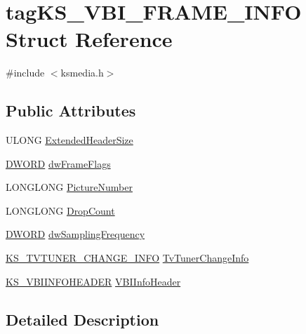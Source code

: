 \hypertarget{structtag_k_s___v_b_i___f_r_a_m_e___i_n_f_o}{}\section{tag\+K\+S\+\_\+\+V\+B\+I\+\_\+\+F\+R\+A\+M\+E\+\_\+\+I\+N\+FO Struct Reference}
\label{structtag_k_s___v_b_i___f_r_a_m_e___i_n_f_o}


{\ttfamily \#include $<$ksmedia.\+h$>$}

\subsection*{Public Attributes}
\begin{DoxyCompactItemize}
\item 
U\+L\+O\+NG \hyperlink{structtag_k_s___v_b_i___f_r_a_m_e___i_n_f_o_a42566ef5e7c61900b52aeed3ca15149b}{Extended\+Header\+Size}
\item 
\hyperlink{mapinls_8h_ad342ac907eb044443153a22f964bf0af}{D\+W\+O\+RD} \hyperlink{structtag_k_s___v_b_i___f_r_a_m_e___i_n_f_o_ae8ca9d7da7efe2f809eadd86ae5075ca}{dw\+Frame\+Flags}
\item 
L\+O\+N\+G\+L\+O\+NG \hyperlink{structtag_k_s___v_b_i___f_r_a_m_e___i_n_f_o_a0aa01468b10fe93640baeaa8ee391cab}{Picture\+Number}
\item 
L\+O\+N\+G\+L\+O\+NG \hyperlink{structtag_k_s___v_b_i___f_r_a_m_e___i_n_f_o_a207b6c8ff74cfd8f5df3f383abd673bc}{Drop\+Count}
\item 
\hyperlink{mapinls_8h_ad342ac907eb044443153a22f964bf0af}{D\+W\+O\+RD} \hyperlink{structtag_k_s___v_b_i___f_r_a_m_e___i_n_f_o_a2c58c23989c86a6e983da1deb54c607a}{dw\+Sampling\+Frequency}
\item 
\hyperlink{ksmedia_8h_adcb8ce95750edb9d08b339126fb13633}{K\+S\+\_\+\+T\+V\+T\+U\+N\+E\+R\+\_\+\+C\+H\+A\+N\+G\+E\+\_\+\+I\+N\+FO} \hyperlink{structtag_k_s___v_b_i___f_r_a_m_e___i_n_f_o_a4d045870a25d0cab8aabb42d69b9c026}{Tv\+Tuner\+Change\+Info}
\item 
\hyperlink{ksmedia_8h_a8d02c7af80e7864a38e331c8c42d6fa2}{K\+S\+\_\+\+V\+B\+I\+I\+N\+F\+O\+H\+E\+A\+D\+ER} \hyperlink{structtag_k_s___v_b_i___f_r_a_m_e___i_n_f_o_a83deebc767f643043aee6711b272b7bb}{V\+B\+I\+Info\+Header}
\end{DoxyCompactItemize}


\subsection{Detailed Description}


